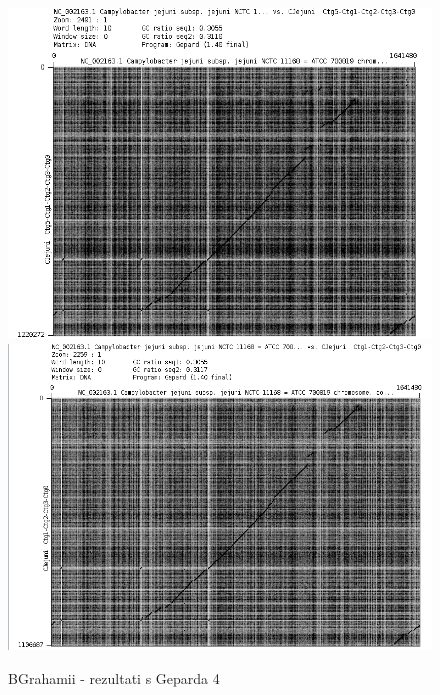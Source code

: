 \begin{figure}[H]
    \centering
    \includegraphics[scale=0.5]{img/Grah4.png}
    \includegraphics[scale=0.5]{img/Grah5.png}
    \caption{BGrahamii - rezultati s Geparda 4}
    \label{fig:grahmi4}
\end{figure}

